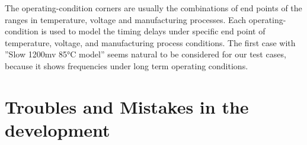 The operating-condition corners are usually the combinations of end points of the ranges in temperature, voltage and manufacturing processes.
Each operating-condition is used to model the timing delays under specific end point of temperature, voltage, and manufacturing process conditions.
The first case with ''Slow 1200mv 85°C model'' seems natural to be considered for our test cases, because it shows frequencies under long term 
operating conditions. 
\section{Troubles and Mistakes in the development}
